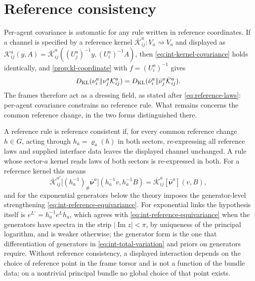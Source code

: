 \section{Reference consistency}

Per-agent covariance is automatic for any rule written in reference coordinates. If a channel is specified by a reference kernel $\bar{\mathcal K}_{ij}^a:V_a\rightsquigarrow V_a$ and displayed as $\mathcal K_{ij}^a(y,A)=\bar{\mathcal K}_{ij}^a((U_j^a)^{-1}y,(U_i^a)^{-1}A)$, then \cref{eq:int-kernel-covariance} holds identically, and \cref{prop:kl-coordinate} with $f=(U_i^a)^{-1}$ gives
\begin{equation}
D_{\mathrm{KL}}(\nu_i^a\Vert\nu_j^a\mathcal K_{ij}^a)
=D_{\mathrm{KL}}(\bar\nu_i^a\Vert\bar\nu_j^a\bar{\mathcal K}_{ij}^a).
\label{eq:int-dressed-cost}
\end{equation}
The frames therefore act as a dressing field, as stated after \cref{eq:reference-laws}: per-agent covariance constrains no reference rule. What remains concerns the common reference change, in the two forms distinguished there.

A reference rule is reference consistent if, for every common reference change $h\in G$, acting through $h_a=\varrho_a(h)$ in both sectors, re-expressing all reference laws and supplied interface data leaves the displayed channel unchanged. A rule whose sector-$a$ kernel reads laws of both sectors is re-expressed in both. For a reference kernel this means
\begin{equation}
\bar{\mathcal K}_{ij}^{a\prime}\bigl[(h_a^{-1})_\#\bar{\boldsymbol\nu}^a\bigr](h_a^{-1}v,h_a^{-1}B)
=\bar{\mathcal K}_{ij}^a[\bar{\boldsymbol\nu}^a](v,B),
\label{eq:int-kernel-reference}
\end{equation}
and for the exponential generators below the theory imposes the generator-level strengthening \cref{eq:int-reference-equivariance}. For exponential links the hypothesis itself is $e^{L'}=h_a^{-1}e^{L}h_a$, which agrees with \cref{eq:int-reference-equivariance} when the generators have spectra in the strip $|\operatorname{Im}z|<\pi$, by uniqueness of the principal logarithm, and is weaker otherwise; the generator form is the one that differentiation of generators in \cref{eq:int-total-variation} and priors on generators require. Without reference consistency, a displayed interaction depends on the choice of reference point in the frame torsor and is not a function of the bundle data; on a nontrivial principal bundle no global choice of that point exists.

